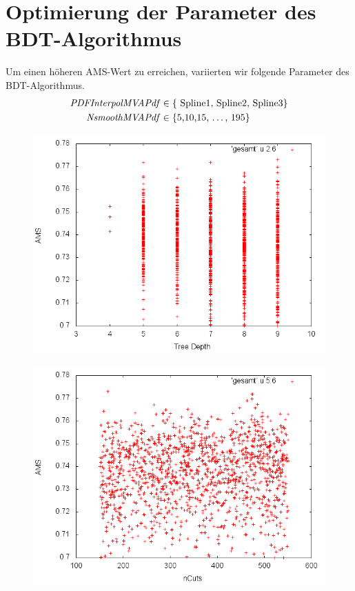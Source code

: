 \section{Optimierung der Parameter des BDT-Algorithmus}
Um einen höheren AMS-Wert zu erreichen, variierten wir folgende Parameter des BDT-Algorithmus.
\begin{equation}
\begin{split}
 \mbox{\textit{PDFInterpolMVAPdf}} &\in \{ \mbox{ Spline1,  Spline2, Spline3}  \}  \\
 \mbox{\textit{NsmoothMVAPdf}} &\in \{ \mbox{5,10,15, \ldots, 195} \}
\end{split}
\end{equation}

\begin{figure}[htp]
\begin{center}
  \includegraphics[width=0.7\linewidth]{sections/parameter_optimization_bdt/Depth.png}
 \caption[]{}
\label{fig:bdt_Depth}
\end{center}
\end{figure}

\begin{figure}[htp]
\begin{center}
  \includegraphics[width=0.7\linewidth]{sections/parameter_optimization_bdt/nCuts.png}
 \caption[]{}
\label{fig:bdt_nCuts}
\end{center}
\end{figure}



